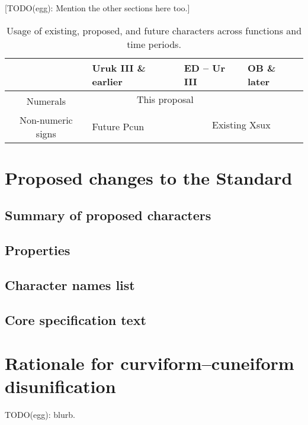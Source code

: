 \documentclass[10pt, a4paper, twoside]{article}
\begin{document}
[TODO(egg): Mention the other sections here too.]

\begin{table}
\begin{center}
\begin{tabular}{ l | l | l | l |} \cline{2-4}
                                                & Uruk III \& earlier & ED – Ur III                         & OB \& later    \\\hline
\multicolumn{1}{|c|}{\multirow{2}{*}{Numerals}} & \multicolumn{2}{|c|}{This proposal}                       &                \\\cline{2-4}
\multicolumn{1}{|c|}{}                          &                     & \multicolumn{2}{|c|}{\multirow{2}{*}{Existing Xsux}} \\\cline{1-2}
\multicolumn{1}{|c|}{Non-numeric signs}         & Future Pcun         & \multicolumn{2}{|c|}{}                               \\\hline
\end{tabular}
\caption{Usage of existing, proposed, and future characters across functions and time periods.}
\end{center}
\label{tableUnificationsDisunifications}
\end{table}

\section{Proposed changes to the Standard}
\label{proposal}
\subsection{Summary of proposed characters}
\subsection{Properties}
\label{properties}
\subsection{Character names list}
\subsection{Core specification text}

\section{Rationale for curviform--cuneiform disunification}
\label{disunificationRationale}
TODO(egg): blurb.
\end{document}
